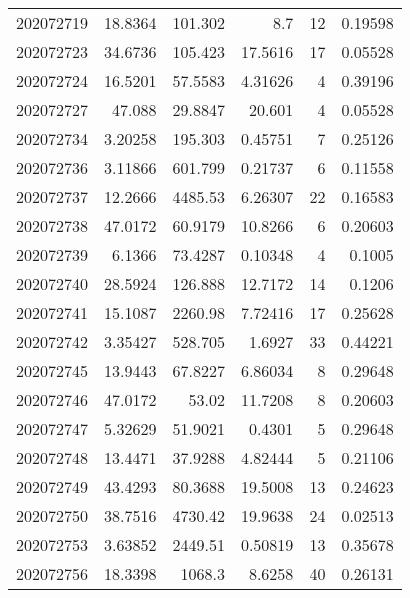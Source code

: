 \begin{tabular}{rrrrrr}
 202072719 &         18.8364  &      101.302  &            8.7     &          12 & 0.19598 \\
 202072723 &         34.6736  &      105.423  &           17.5616  &          17 & 0.05528 \\
 202072724 &         16.5201  &       57.5583 &            4.31626 &           4 & 0.39196 \\
 202072727 &         47.088   &       29.8847 &           20.601   &           4 & 0.05528 \\
 202072734 &          3.20258 &      195.303  &            0.45751 &           7 & 0.25126 \\
 202072736 &          3.11866 &      601.799  &            0.21737 &           6 & 0.11558 \\
 202072737 &         12.2666  &     4485.53   &            6.26307 &          22 & 0.16583 \\
 202072738 &         47.0172  &       60.9179 &           10.8266  &           6 & 0.20603 \\
 202072739 &          6.1366  &       73.4287 &            0.10348 &           4 & 0.1005  \\
 202072740 &         28.5924  &      126.888  &           12.7172  &          14 & 0.1206  \\
 202072741 &         15.1087  &     2260.98   &            7.72416 &          17 & 0.25628 \\
 202072742 &          3.35427 &      528.705  &            1.6927  &          33 & 0.44221 \\
 202072745 &         13.9443  &       67.8227 &            6.86034 &           8 & 0.29648 \\
 202072746 &         47.0172  &       53.02   &           11.7208  &           8 & 0.20603 \\
 202072747 &          5.32629 &       51.9021 &            0.4301  &           5 & 0.29648 \\
 202072748 &         13.4471  &       37.9288 &            4.82444 &           5 & 0.21106 \\
 202072749 &         43.4293  &       80.3688 &           19.5008  &          13 & 0.24623 \\
 202072750 &         38.7516  &     4730.42   &           19.9638  &          24 & 0.02513 \\
 202072753 &          3.63852 &     2449.51   &            0.50819 &          13 & 0.35678 \\
 202072756 &         18.3398  &     1068.3    &            8.6258  &          40 & 0.26131 \\

\end{tabular}
